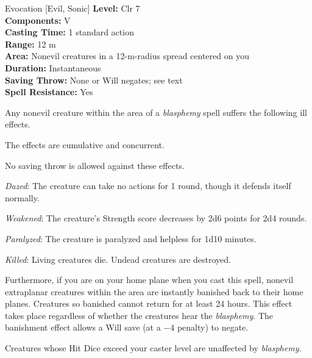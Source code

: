 {Evocation [Evil, Sonic]}
{
	\textbf{Level:}
	Clr 7\\
	\textbf{Components:}
	V\\
	\textbf{Casting Time:}
	1 standard action\\
	\textbf{Range:}
	12 m\\
	\textbf{Area:}
	Nonevil creatures in a 12-m-radius spread centered on you\\
	\textbf{Duration:}
	Instantaneous\\
	\textbf{Saving Throw:}
	None or Will negates; see text\\
	\textbf{Spell Resistance:}
	Yes\\
}
{
	Any nonevil creature within the area of a \emph{blasphemy} spell suffers the following ill effects.


	The effects are cumulative and concurrent.

	No saving throw is allowed against these effects.

	\textit{Dazed}:
	The creature can take no actions for 1 round, though it defends itself normally.

	\textit{Weakened}:
	The creature's Strength score decreases by 2d6 points for 2d4 rounds.

	\textit{Paralyzed}:
	The creature is paralyzed and helpless for 1d10 minutes.

	\textit{Killed}:
	Living creatures die. Undead creatures are destroyed.

	Furthermore, if you are on your home plane when you cast this spell, nonevil extraplanar creatures within the area are instantly banished back to their home planes. Creatures so banished cannot return for at least 24 hours. This effect takes place regardless of whether the creatures hear the \emph{blasphemy}. The banishment effect allows a Will save (at a $-4$ penalty) to negate.

	Creatures whose Hit Dice exceed your caster level are unaffected by \emph{blasphemy}.

}
